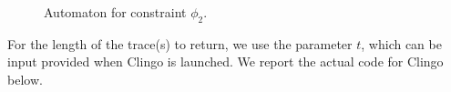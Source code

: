 \begin{figure}
	\begin{center}
	\end{center}
\caption{Automaton for constraint $\phi_2$.\label{fig:presence}}
\end{figure}
For the length of the trace(s) to return, we use the parameter 
$t$, which can be input provided when Clingo is launched.
We report the actual code for Clingo below.

